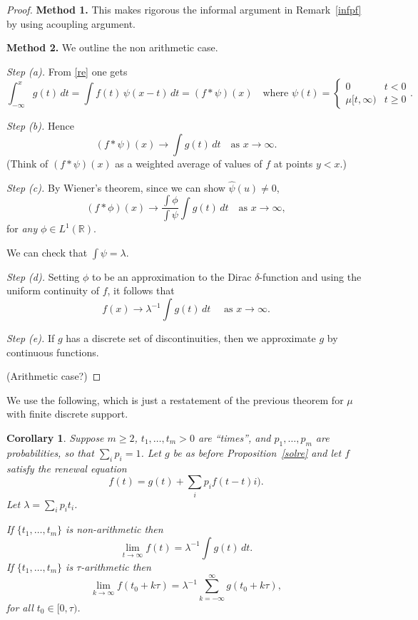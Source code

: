 \documentclass[a4paper]{amsart}
\theoremstyle{plain}
\newtheorem{corollary}[theorem]{Corollary}
\theoremstyle{definition}
\theoremstyle{remark}
\begin{document}
\begin{proof}
\textbf{Method 1.} This makes rigorous the informal argument in Remark~\ref{infpf} by using acoupling argument.

\bigskip 
\noindent \textbf{Method 2.} We outline the non arithmetic case.

\noindent \emph{Step (a).}  From \eqref{re} one gets
\[
\int_{-\infty}^x g(t)\, dt = \int f(t)\, \psi(x-t)\, dt = (f*\psi)(x) \quad \text{where }   \psi(t) = \begin{cases} 0 & t< 0 \\ \mu[t,\infty) &t \geq 0 \end{cases}.
\]
 
 \medskip \noindent \emph{Step (b).} Hence
 \[
 (f * \psi)(x) \to \int g(t)\, dt \quad \text{as } x \to \infty .
 \]
 (Think of $ (f*\psi) (x)$  as a weighted average of   values of $ f $ at points $ y < x $.)
 
 \medskip \noindent \emph{Step (c).} By Wiener's theorem, since we can show $ \widehat{\psi} (u) \neq 0 $, 
 \[
 (f * \phi)(x) \to \frac{\int \phi}{\int \psi} \int g(t)\, dt \quad \text{as } x \to \infty,
 \]
 for \emph{any} $ \phi \in L^1( \mathbb{R} ) $.
 
 We can check that $   \int \psi = \lambda $.

 \medskip \noindent \emph{Step (d).} Setting $ \phi $ to be an approximation to the Dirac $ \delta $-function and using the uniform continuity of $ f $, it follows that
 \[ 
 f(x) \to \lambda ^{-1} \int g(t)\, dt \quad \text{ as } x \to \infty .
 \]
 
  \medskip \noindent \emph{Step (e).} If $ g $ has  a discrete set of discontinuities, then we   approximate $ g $ by continuous functions.
 
\medskip (Arithmetic case?)
\end{proof} 

We use the following, which is just a restatement of the previous theorem   for $ \mu $ with finite discrete support.

\begin{corollary}
Suppose $ m \geq 2 $, $ t_1,\dots, t_m >0 $ are ``times'', and $ p_1,\dots , p_m $ are probabilities, so that $ \sum_i p_i = 1 $. Let $ g $ be as before Proposition~\ref{solre} and let $ f $ satisfy the renewal equation
\begin{equation} \label{} 
f(t) = g(t) + \sum_i p_i f(t - t)i).
\end{equation} 
Let $ \lambda = \sum_i p_i t_i $.

If  $ \{t_1,\dots, t_m \} $ is non-arithmetic then 
\[
\lim_{t\to \infty} f(t) = \lambda ^{-1} \int g(t)\, dt.
\]
If $ \{t_1,\dots, t_m \} $ is $ \tau $-arithmetic then 
\[
\lim_{ k \to \infty}  f(t_0 + k\tau ) =  \lambda ^{-1} \sum_{k=-\infty}^\infty g(t_0 + k\tau ),
\]
for all $ t_0 \in [0,\tau) $.
\end{corollary} 
\end{document}
